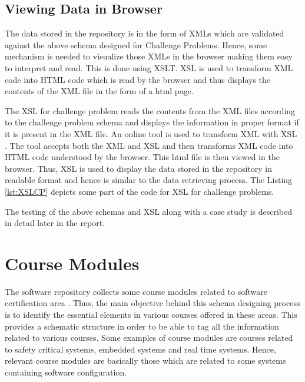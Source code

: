 \documentclass[11pt,letterpaper]{report}
\begin{document}


\section{Viewing Data in Browser}
The data stored in the repository is in the form of XMLs which are validated against the above schema designed for Challenge Problems. Hence, some mechanism is needed to visualize those XMLs in the browser making them easy to interpret and read. This is done using XSLT. XSL is used to transform XML code into HTML code which is read by the browser and thus displays the contents of the XML file in the form of a html page. 

The XSL for challenge problem reads the contents from the XML files according to the challenge problem schema and displays the information in proper format if it is present in the XML file. An online tool is used to transform XML with XSL \cite{olXSL}. The tool accepts both the XML and XSL and then transforms XML code into HTML code understood by the browser. This html file is then viewed in the browser. Thus, XSL is used to display the data stored in the repository in readable format and hence is similar to the data retrieving process. The Listing \ref{lst:XSLCP} depicts some part of the code for XSL for challenge problems.



\bigskip
The testing of the above schemas and XSL along with a case study is described in detail later in the report. 

\chapter{Course Modules}
The software repository collects some course modules related to software certification area \cite{York,Waterloo,MaC,Victoria}. Thus, the main objective behind this schema designing process is to identify the essential elements in various courses offered in these areas. This provides a schematic structure in order to be able to tag all the information related to various courses. Some examples of course modules are courses related to safety critical systems, embedded systems and real time systems. Hence, relevant course modules are basically those which are related to some systems containing software configuration. 
\end{document}
